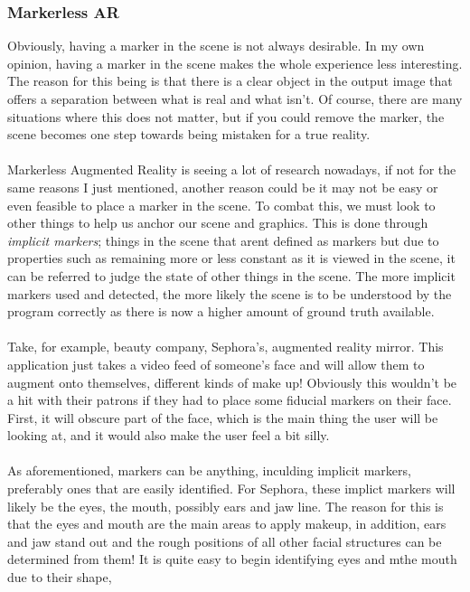 \documentclass[11pt]{article}
\begin{document}
\subsubsection{Markerless AR}
Obviously, having a marker in the scene is not always desirable.
In my own opinion, having a marker in the scene makes the whole
experience less interesting. The reason for this being is that there is
a clear object in the output image that offers a  
separation between what is real and what isn't. Of course, there
are many situations where this does not matter, but if you could 
remove the marker, the scene becomes one step towards being mistaken
for a true reality.\\
\\
Markerless Augmented Reality is seeing a lot of research nowadays, if not
for the same reasons I just mentioned, another reason could be it may not 
be easy or even feasible to place a marker in the scene. 
To combat this, we must
look to other things to help us anchor our scene and graphics. This is done
through \textit{implicit markers}; things in the scene that arent defined
as markers but due to properties such as remaining more or less constant 
as it is viewed in the scene, it can be referred to judge the state of other
things in the scene. The more implicit markers used and detected, the more
likely the scene is to be understood by the program correctly as there is
now a higher amount of ground truth available.\\
\\
Take, for example, beauty company, Sephora's, augmented reality mirror.
This application just takes a video feed of someone's face and will allow
them to augment onto themselves, different kinds of make up! Obviously 
this wouldn't be a hit with their patrons if they had to place some 
fiducial markers on their face. First, it will obscure part of the face, 
which is the main thing
the user will be looking at, and it would also make the user feel a bit 
silly. \\
\\
As aforementioned, markers can be anything, inculding implicit markers,
preferably ones that are easily identified. For Sephora, these implict
markers will likely be the eyes, the mouth, possibly ears and jaw line.
The reason for this is that the eyes and mouth are the main areas to
apply makeup, in addition, ears and jaw stand out and the rough positions
of all other facial structures can be determined from them! It is quite
easy to begin identifying eyes and mthe mouth due to their shape, 
\end{document}
